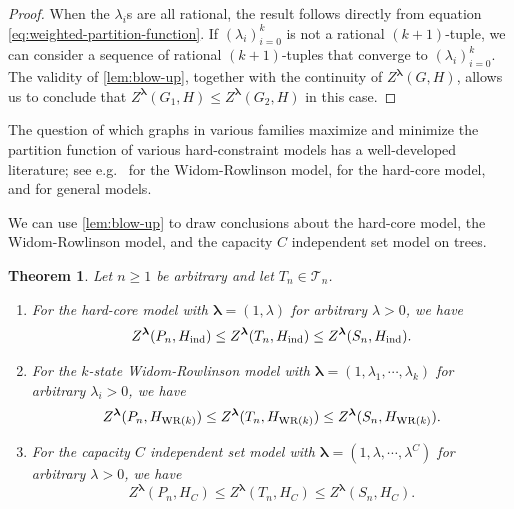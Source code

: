 \documentclass[11pt]{article}
\newtheorem{theorem}{Theorem}[section]
\theoremstyle{definition}
\begin{document}
\begin{proof}
When the $\lambda_i$s are all rational, the result follows directly from equation \eqref{eq:weighted-partition-function}. If $(\lambda_i)_{i=0}^k$ is not a rational $(k+1)$-tuple, we can consider a sequence of rational $(k+1)$-tuples that converge to $(\lambda_i)_{i=0}^k$. The validity of \cref{lem:blow-up}, together with the continuity of $Z^{\boldsymbol\lambda}(G,H)$, allows us to conclude that $Z^{\boldsymbol\lambda}(G_1,H) \le Z^{\boldsymbol\lambda}(G_2,H)$ in this case.     
\end{proof}

The question of which graphs in various families maximize and minimize the partition function of various hard-constraint models has a well-developed literature; see e.g.~\cite{CohenPerkinsTetali2017, CutlerRadcliffe2011, Sernau2018} for the Widom-Rowlinson model, \cite{Kahn2001, Zhao2010, DaviesJenssenPerkinsRoberts2017} for the hard-core model, and \cite{CutlerKass2020, CutlerRadcliffe2011, CutlerRadcliffe2014, GalvinTetali2004, Galvin2006, SahSawhneyStonerZhao2020} for general models.

We can use \cref{lem:blow-up} to draw conclusions about the hard-core model, the Widom-Rowlinson model, and the capacity $C$ independent set model on trees.

\begin{theorem}
Let $n \ge 1$ be arbitrary and let $T_n \in \mathcal{T}_n$.
\begin{enumerate}
    \item[(a)] For the hard-core model with ${\boldsymbol\lambda}=(1,\lambda)$ for arbitrary $\lambda > 0$, we have
    \[
    Z^{\boldsymbol\lambda}(P_n,H_{\rm ind}) \le Z^{\boldsymbol\lambda}(T_n,H_{\rm ind}) \le Z^{\boldsymbol\lambda}(S_n,H_{\rm ind}).
    \]
    
    \item[(b)] For the $k$-state Widom-Rowlinson model with ${\boldsymbol\lambda}=(1,\lambda_1, \cdots, \lambda_k)$ for arbitrary $\lambda_i > 0$, we have
    \[
    Z^{\boldsymbol\lambda}(P_n,H_{{\rm WR}(k)}) \le Z^{\boldsymbol\lambda}(T_n,H_{{\rm WR}(k)}) \le Z^{\boldsymbol\lambda}(S_n,H_{{\rm WR}(k)}).
    \]
      
    \item[(c)] For the capacity $C$ independent set model with ${\boldsymbol\lambda}=(1, \lambda, \cdots, \lambda^C)$ for arbitrary $\lambda > 0$, we have
    \[
    Z^{\boldsymbol\lambda}(P_n,H_C) \le Z^{\boldsymbol\lambda}(T_n,H_C) \le Z^{\boldsymbol\lambda}(S_n,H_C).
    \]
\end{enumerate}
\end{theorem}
\end{document}
